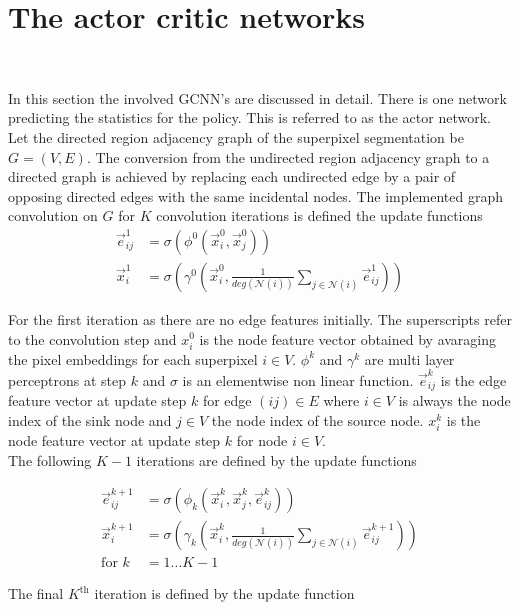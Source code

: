 \section{The actor critic networks}~\label{sec:sag_gcn}

In this section the involved GCNN's are discussed in detail. There is one network predicting the statistics for the policy. This is referred to as the actor network. Let the directed region adjacency graph of the superpixel segmentation be $G=(V,E)$. The conversion from the undirected region adjacency graph to a directed graph is achieved by replacing each undirected edge by a pair of opposing directed edges with the same incidental nodes. The implemented graph convolution on $G$ for $K$ convolution iterations is defined the update functions\\

\begin{align}
\vec{e}_{ij}^{1} &= \sigma \left( \phi^0 \left(\vec{x}_i^{0}, \vec{x}_j^{0} \right)\right)\\
\vec{x}_i^1 &= \sigma \left( \gamma^0 \left(\vec{x}_i^0, \frac{1}{deg(\mathcal{N}(i))} \sum_{j \in \mathcal{N}(i)}  \vec{e}_{ij}^1 \right)\right)
\end{align}

For the first iteration as there are no edge features initially. The superscripts refer to the convolution step and $x_i^0$ is the node feature vector obtained by avaraging the pixel embeddings for each superpixel $i \in V$. 
$\phi^k$ and $\gamma^k$ are multi layer perceptrons at step $k$ and $\sigma$ is an elementwise non linear function.
$\vec{e}_{ij}^{k}$ is the edge feature vector at update step $k$ for edge $(ij) \in E$ where $i \in V$ is always the node index of the sink node and $j \in V$ the node index of the source node. $x_i^k$ is the node feature vector at update step $k$ for node $i \in V$.\\
The following $K-1$ iterations are defined by the update functions

\begin{align}
\vec{e}_{ij}^{k+1} &= \sigma \left( \phi_k \left(\vec{x}_i^k, \vec{x}_j^k, \vec{e}_{ij}^k \right)\right)\\
\vec{x}_i^{k+1} &= \sigma \left( \gamma_k \left(\vec{x}_i^k, \frac{1}{deg(\mathcal{N}(i))} \sum_{j \in \mathcal{N}(i)}  \vec{e}_{ij}^{k+1} \right) \right)\\
\text{for }k&=1...K-1
\end{align}

The final $K^{\text{th}}$ iteration is defined by the update function

